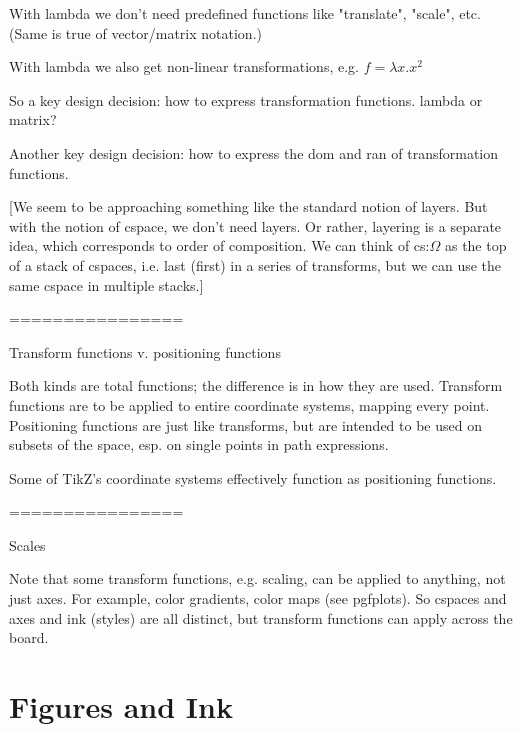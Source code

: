 \documentclass[12pt]{tufte-handout}
\numberwithin{equation}{subsection}
\numberwithin{equation}{subsection}
\begin{document}
{  With lambda we don't need predefined functions like "translate",
  "scale", etc.  (Same is true of vector/matrix notation.)

  With lambda we also get non-linear transformations, e.g.
  \(f = \lambda x.x^2\)

  So a key design decision: how to express transformation functions.
  lambda or matrix?

  Another key design decision: how to express the dom and ran of
  transformation functions.

  [We seem to be approaching something like the standard notion of
    layers.  But with the notion of cspace, we don't need layers.  Or
    rather, layering is a separate idea, which corresponds to order of
    composition.  We can think of cs:$\Omega$ as the top of a stack of
    cspaces, i.e. last (first) in a series of transforms, but we can use
    the same cspace in multiple stacks.]

  ================

  Transform functions v. positioning functions

  Both kinds are total functions; the difference is in how they are
  used.  Transform functions are to be applied to entire coordinate
  systems, mapping every point.  Positioning functions are just like
  transforms, but are intended to be used on subsets of the space,
  esp. on single points in path expressions.

  Some of TikZ's coordinate systems effectively function as positioning functions.

  ================

  Scales

  Note that some transform functions, e.g. scaling, can be applied to
  anything, not just axes.  For example, color gradients, color maps
  (see pgfplots).  So cspaces and axes and ink (styles) are all
  distinct, but transform functions can apply across the board.





  \part{Figures and Ink}
  \label{sect:representation}

}
\end{document}
